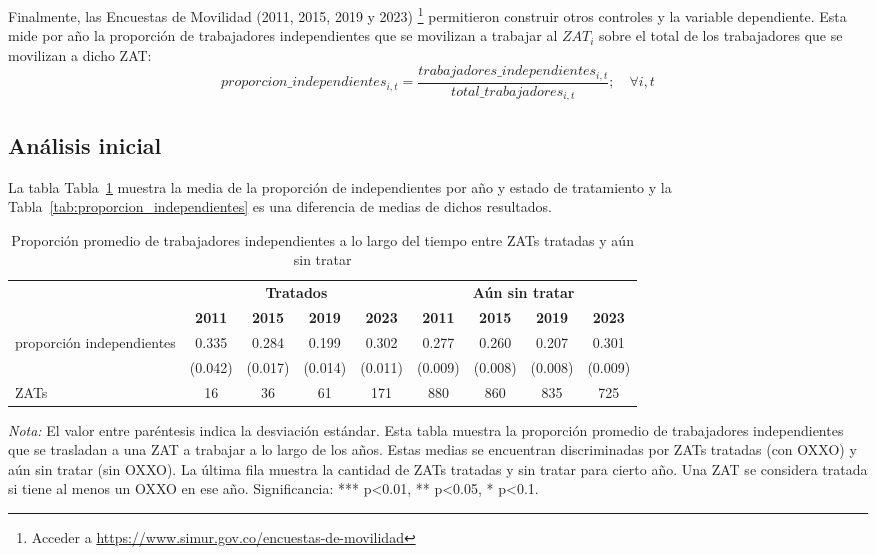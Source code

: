 \documentclass{article}
\begin{document}
Finalmente, las Encuestas de Movilidad (2011, 2015, 2019 y 2023) \footnote{Acceder a \url{https://www.simur.gov.co/encuestas-de-movilidad}} permitieron construir otros controles y la variable dependiente. Esta mide por año la proporción de trabajadores independientes que se movilizan a trabajar al $ZAT_i$ sobre el total de los trabajadores que se movilizan a dicho ZAT:\\

\begin{equation}
    proporcion\_independientes_{i,t}=\frac{trabajadores\_independientes_{i,t}}{total\_trabajadores_{i,t}} ; \quad \forall i, t
\end{equation}

\subsection{Análisis inicial}

La tabla Tabla~\ref{tab:independientes_zats} muestra la media de la proporción de independientes por año y estado de tratamiento y la Tabla~\ref{tab:proporcion_independientes} es una diferencia de medias de dichos resultados.  

\begin{table} [H]
  \centering
  \caption{Proporción promedio de trabajadores independientes a lo largo del tiempo entre ZATs tratadas y aún sin tratar}
  \label{tab:independientes_zats}
  \begin{adjustbox}{width=\textwidth,center} %
    \begin{tabular}{lcccccccc}
      \toprule
      & \multicolumn{4}{c}{\textbf{Tratados}} & \multicolumn{4}{c}{\textbf{Aún sin tratar}} \\
      \cmidrule(lr){2-5} \cmidrule(lr){6-9}
      & \textbf{2011} & \textbf{2015} & \textbf{2019} & \textbf{2023} & \textbf{2011} & \textbf{2015} & \textbf{2019} & \textbf{2023} \\
      \midrule
      proporción independientes & 0.335 & 0.284 & 0.199 & 0.302 & 0.277 & 0.260 & 0.207 & 0.301 \\
      & (0.042) & (0.017) & (0.014) & (0.011) & (0.009) & (0.008) & (0.008) & (0.009) \\
      \midrule
      ZATs & 16 & 36 & 61 & 171 & 880 & 860 & 835 & 725 \\
      \bottomrule
    \end{tabular}
  \end{adjustbox} %
  \parbox[t]{\textwidth}{%
    \vspace{0.5em}
    \footnotesize{ \textit{Nota:} El valor entre paréntesis indica la desviación estándar. Esta tabla muestra la proporción promedio de trabajadores independientes que se trasladan a una ZAT a trabajar a lo largo de los años. Estas medias se encuentran discriminadas por ZATs tratadas (con OXXO) y aún sin tratar (sin OXXO). La última fila muestra la cantidad de ZATs tratadas y sin tratar para cierto año. Una ZAT se considera tratada si tiene al menos un OXXO en ese año. Significancia: *** p<0.01, ** p<0.05, * p<0.1.}
  }
\end{table}
\end{document}
